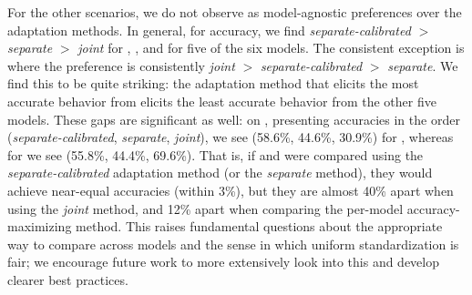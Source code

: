 For the other scenarios, we do not observe as model-agnostic preferences over the adaptation methods.
In general, for accuracy, we find \textit{separate-calibrated} $>$ \textit{separate} $>$ \textit{joint} for \openbookqa, \truthfulqa, and \mmlu for five of the six models.
The consistent exception is \anthropic where the preference is consistently \textit{joint} $>$ \textit{separate-calibrated} $>$ \textit{separate}.
We find this to be quite striking: the adaptation method that elicits the most accurate behavior from \anthropic elicits the least accurate behavior from the other five models.
These gaps are significant as well: on \openbookqa, presenting accuracies in the order (\textit{separate-calibrated}, \textit{separate}, \textit{joint}), we see (58.6\%, 44.6\%, 30.9\%) for \optonesevenfive, whereas for \anthropic we see (55.8\%, 44.4\%, 69.6\%).
That is, if \optonesevenfive and \anthropic were compared using the \textit{separate-calibrated} adaptation method (or the \textit{separate} method), they would achieve near-equal accuracies (within 3\%), but they are almost 40\% apart when using the \textit{joint} method, and 12\% apart when comparing the per-model accuracy-maximizing method.
This raises fundamental questions about the appropriate way to compare across models and the sense in which uniform standardization is fair; we encourage future work to more extensively look into this and develop clearer best practices.